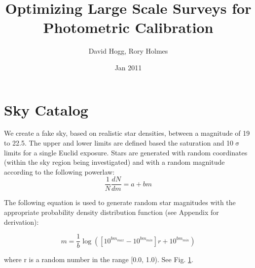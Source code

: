 \documentclass[12pt,a4paper,twoside]{article}
\author{David Hogg, Rory Holmes}
\title{Optimizing Large Scale Surveys for Photometric Calibration}
\date{Jan 2011}
\makeatletter
\def\maketitle{%
  \null
  \thispagestyle{empty}%
  \vfill
  \begin{center}\leavevmode
    \normalfont
    {\LARGE \@title\par}%
    \vskip 1cm
    {\Large \@author\par}%
    \vskip 1cm
    {\Large \@date\par}%
  \end{center}%
  \vfill
  \null
  \cleardoublepage
  }
\makeatother
\begin{document}
\maketitle

\section{Sky Catalog}
We create a fake sky, based on realistic star densities, between a magnitude of 19 to 22.5. The upper and lower limits are defined based the saturation and 10$\upsigma$ limits for a single Euclid exposure. Stars are generated with random coordinates (within the sky region being investigated) and with a random magnitude according to the following powerlaw:
\begin{equation}
\frac{1}{N} \frac{dN}{dm} = a + b m
\end{equation}

The following equation is used to generate random star magnitudes with the appropriate probability density distribution function (see Appendix for derivation):

\begin{equation}
m = \frac{1}{b} \log{(\left[ 10^{b m_{max}} - 10^{b m_{min}} \right] r + 10^{b m_{min}})}
\end{equation}

\noindent{}where r is a random number in the range [0.0, 1.0). See Fig. \ref{fig:catalog}. 

\begin{figure}[ht]
\centering
{}
\label{fig:catalog}
\end{figure}
\end{document}
